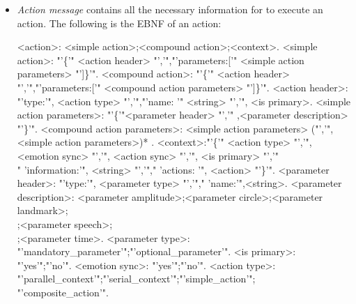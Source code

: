 \begin{itemize}
	\item \textit{Action message} contains all the necessary information for to execute an action. The following is the EBNF of an action:
\begin{grammar}
<action>: <simple action>;<compound action>;<context>.
<simple action>: "'\{'" <action header> "','","'parameters:['" <simple action parameters> "']\}'".
<compound action>: "'\{'" <action header> "','","'parameters:['" <compound action parameters> "']\}'".
<action header>: "'type:'", <action type> "','","'name: '" <string>  "','", <is primary>.
<simple action parameters>: "'\{'"<parameter header> "','" ,<parameter description> "'\}'". 
<compound action parameters>:  <simple action parameters> ("','", <simple action parameters>)* .
<context>:"'\{'" <action type> "','", <emotion sync> "','", <action sync> "','", <is primary> "','"\\" 'information:'", <string> "','"," 'actions: '", <action> "'\}'".
<parameter header>: "'type:'", <parameter type> "','"," 'name:'",<string>.
<parameter description>: <parameter amplitude>;<parameter circle>;<parameter landmark>;\\<parameter point>;<parameter speech>;\\<parameter square>;<parameter time>.
<parameter type>: "'mandatory\_parameter'";"'optional\_parameter'". 
<is primary>: "'yes'";"'no'".
<emotion sync>: "'yes'";"'no'".
<action type>: "'parallel\_context'";"'serial\_context'";"'simple\_action'";\\"'composite\_action'".
\end{grammar}
\end{itemize} 
